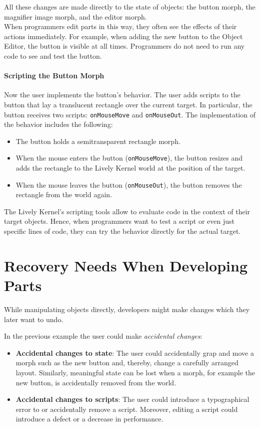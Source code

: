 All these changes are made directly to the state of objects: the button morph, the magnifier image morph, and the editor morph.\\
When programmers edit parts in this way, they often see the effects of their actions immediately.
For example, when adding the new button to the Object Editor, the button is visible at all times.
Programmers do not need to run any code to see and test the button.

\paragraph{Scripting the Button Morph}
Now the user implements the button's behavior.
The user adds scripts to the button that lay a translucent rectangle over the current target.
In particular, the button receives two scripts: \lstinline{onMouseMove} and \lstinline{onMouseOut}.
The implementation of the behavior includes the following: 
\begin{itemize}
    \item The button holds a semitransparent rectangle morph.
    \item When the mouse enters the button (\lstinline{onMouseMove}), the button resizes and adds the rectangle to the Lively Kernel world at the position of the target.
    \item When the mouse leaves the button (\lstinline{onMouseOut}), the button removes the rectangle from the world again.
\end{itemize}
 
The Lively Kernel's scripting tools allow to evaluate code in the context of their target objects.
Hence, when programmers want to test a script or even just specific lines of code, they can try the behavior directly for the actual target.


\section{Recovery Needs When Developing Parts}

While manipulating objects directly, developers might make changes which they later want to undo.

In the previous example the user could make \emph{accidental changes}:

\begin{itemize}
    \item \textbf{Accidental changes to state}: The user could accidentally grap and move a morph such as the new button and, thereby, change a carefully arranged layout. Similarly, meaningful state can be lost when a morph, for example the new button, is accidentally removed from the world.
    \item \textbf{Accidental changes to scripts}: The user could introduce a typographical error to or accidentally remove a script. Moreover, editing a script could introduce a defect or a decrease in performance.
\end{itemize}


